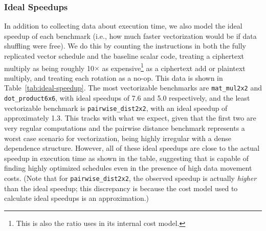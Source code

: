 
\subsubsection*{Ideal Speedups}
In addition to collecting data about execution time, we also model the ideal speedup of each benchmark (i.e., how much faster vectorization would be if data shuffling were free).
We do this by counting the instructions in both the fully replicated vector schedule and the baseline scalar code, treating a ciphertext multiply as being roughly 10$\times$ as expensive\footnote{This is also the ratio \system uses in its internal cost model.} as a ciphertext add or plaintext multiply, and treating each rotation as a no-op.
This data is shown in Table~\ref{tab:ideal-speedup}.
The most vectorizable benchmarks are \texttt{mat\_mul2x2} and \texttt{dot\_product6x6}, with ideal speedups of 7.6 and 5.0 respectively, and the least vectorizable benchmark is \texttt{pairwise\_dist2x2}, with an ideal speedup of approximately 1.3.
This tracks with what we expect, given that the first two are very regular computations and the pairwise distance benchmark represents a worst case scenario for vectorization, being highly irregular with a dense dependence structure.
However, all of these ideal speedups are close to the actual speedup in execution time as shown in the table, suggesting that \system is capable of finding highly optimized schedules even in the presence of high data movement costs. (Note that for \texttt{pairwise\_dist2x2}, the observed speedup is actually {\em higher} than the ideal speedup; this discrepancy is because the cost model used to calculate ideal speedups is an approximation.)


